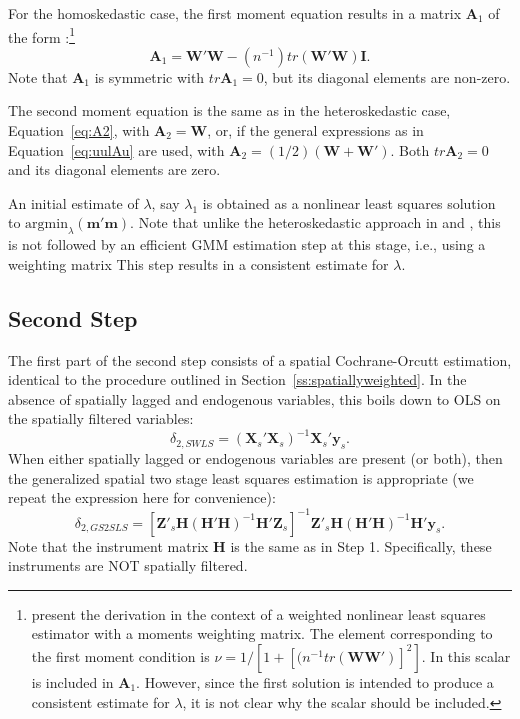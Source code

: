 \documentclass{article}
\begin{document}
For the homoskedastic case, the first moment equation results in a matrix $\mathbf{A}_1$
of the form \citep[see, e.g.,][footnote 7]{KelejianPrucha:10}:\footnote{\citet[Equation 9]{KelejianPrucha:10} present the derivation in the context of a weighted nonlinear
least squares estimator with a moments weighting matrix. The element corresponding
to the first moment condition is $\nu = 1 / [1 + [(n^{-1} tr (\mathbf{WW'})]^2]$. In
\cite{Drukkeretal:10,Drukkeretal:11} this scalar is included in $\mathbf{A}_1$. However, since the
first solution is intended to produce a consistent estimate for $\lambda$, it is not
clear why the scalar should be included.}
\begin{equation*}
\mathbf{A}_1 = \mathbf{W'W} - (n^{-1}) tr (\mathbf{W'W}) \mathbf{I}.
\end{equation*} 
Note that $\mathbf{A}_1$ is symmetric with $tr \mathbf{A}_1 = 0$, but its diagonal
elements are non-zero.
 
The second moment equation is the same as in the heteroskedastic case, Equation~\ref{eq:A2},
with $\mathbf{A}_2 = \mathbf{W}$, or, if the general expressions as in Equation~\ref{eq:uulAu}
are used, with $\mathbf{A}_2 = (1/2) (\mathbf{W} + \mathbf{W'})$. Both $tr \mathbf{A}_2 = 0$
and its diagonal elements are zero.
 
 An initial estimate of $\lambda$,
 say $\lambda_1$ is obtained as a nonlinear least
squares solution to $\mbox{argmin}_\lambda (\mathbf{m'm})$.
Note that unlike the heteroskedastic approach in \cite{KelejianPrucha:10} and \cite{Arraizetal:10},
this is not followed by an efficient GMM estimation step at this stage, i.e., using
a weighting matrix This step results in a consistent estimate for $\lambda$.

\subsection{Second Step}
 The first part of the second step consists of a spatial Cochrane-Orcutt estimation,
 identical to the procedure outlined in Section~\ref{ss:spatiallyweighted}. In the
 absence of spatially lagged and endogenous variables, this boils down to OLS on
 the spatially filtered variables:
 \begin{equation*}
 \delta_{2,SWLS} = (\mathbf{X}_{s}'\mathbf{X}_s)^{-1} \mathbf{X}_{s}' \mathbf{y}_s.
 \end{equation*}
 When either spatially lagged or endogenous variables are present (or both), then
 the generalized spatial two stage least squares estimation is appropriate
 (we repeat the expression here for convenience):
 \begin{equation*}
\delta_{2,GS2SLS} = [ \mathbf{Z'}_s \mathbf{H} (\mathbf{H'H})^{-1} \mathbf{H'} \mathbf{Z}_s ]^{-1} \mathbf{Z'}_s \mathbf{H} (\mathbf{H'H})^{-1} \mathbf{H'} \mathbf{y}_s.
\end{equation*}
Note that the instrument matrix $\mathbf{H}$ is the same as in Step 1. Specifically,
these instruments are NOT spatially filtered.
\end{document}

